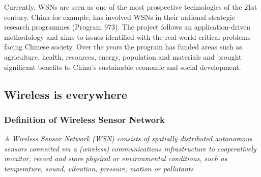 Currently, WSNs are seen as one of the most prospective technologies of the 21st century. China for example, has involved WSNs in their national strategic research programmes (Program 973)\citep{CHINA}. The project follows an application-driven methodology and aims to issues identified with the real-world critical problems facing Chinese society. Over the years the program has funded areas such as agriculture, health, resources, energy, population and materials and brought significant benefits to China's sustainable economic and social development.
\subsection{Wireless is everywhere}
\subsubsection{Definition of Wireless Sensor Network}
\emph{A Wireless Sensor Network (WSN) consists of spatially distributed autonomous sensors connected via a (wireless) communications infrastructure to cooperatively monitor, record and store physical or
environmental conditions, such as temperature, sound, vibration, pressure, motion or pollutants} \citep{SEBA}
